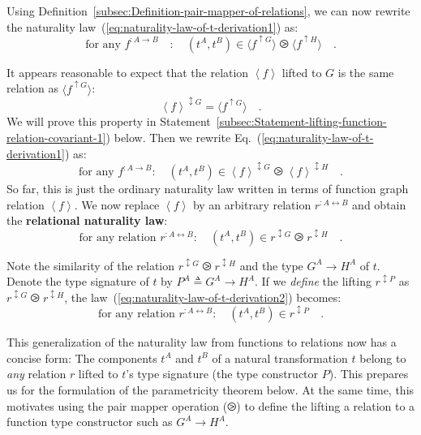 Using Definition~\ref{subsec:Definition-pair-mapper-of-relations},
we can now rewrite the naturality law~(\ref{eq:naturality-law-of-t-derivation1})
as:
\[
\text{for any }f^{:A\rightarrow B}\quad:\quad(t^{A},t^{B})\in\langle f^{\uparrow G}\rangle\ogreaterthan\langle f^{\uparrow H}\rangle\quad.
\]

It appears reasonable to expect that the relation $\left<f\right>$
lifted to $G$ is the same relation as $\langle f^{\uparrow G}\rangle$:
\[
\left<f\right>^{\updownarrow G}=\langle f^{\uparrow G}\rangle\quad.
\]
We will prove this property in Statement~\ref{subsec:Statement-lifting-function-relation-covariant-1})
below. Then we rewrite Eq.~(\ref{eq:naturality-law-of-t-derivation1})
as:
\[
\text{for any }f^{:A\rightarrow B}:\quad(t^{A},t^{B})\in\left<f\right>^{\updownarrow G}\ogreaterthan\left<f\right>^{\updownarrow H}\quad.
\]
So far, this is just the ordinary naturality law written in terms
of function graph relation $\left<f\right>$. We now replace $\left<f\right>$
by an arbitrary relation $r^{:A\leftrightarrow B}$ and obtain the
\textbf{relational naturality law}:
\begin{equation}
\text{for any relation }r^{:A\leftrightarrow B}:\quad(t^{A},t^{B})\in r^{\updownarrow G}\ogreaterthan r^{\updownarrow H}\quad.\label{eq:naturality-law-of-t-derivation2}
\end{equation}

Note the similarity of the relation $r^{\updownarrow G}\ogreaterthan r^{\updownarrow H}$
and the type $G^{A}\rightarrow H^{A}$ of $t$. Denote the type signature
of $t$ by $P^{A}\triangleq G^{A}\rightarrow H^{A}$. If we \emph{define}
the lifting $r^{\updownarrow P}$ as $r^{\updownarrow G}\ogreaterthan r^{\updownarrow H}$,
the law~(\ref{eq:naturality-law-of-t-derivation2}) becomes:
\begin{equation}
\text{for any relation }r^{:A\leftrightarrow B}:\quad(t^{A},t^{B})\in r^{\updownarrow P}\quad.\label{eq:naturality-law-of-t-derivation3}
\end{equation}

This generalization of the naturality law from functions to relations
now has a concise form: The components $t^{A}$ and $t^{B}$ of a
natural transformation $t$ belong to \emph{any} relation $r$ lifted
to $t$\textsf{'}s type signature (the type constructor $P$). This prepares
us for the formulation of the parametricity theorem below. At the
same time, this motivates using the pair mapper operation ($\ogreaterthan$)
to define the lifting a relation to a function type constructor such
as $G^{A}\rightarrow H^{A}$.

